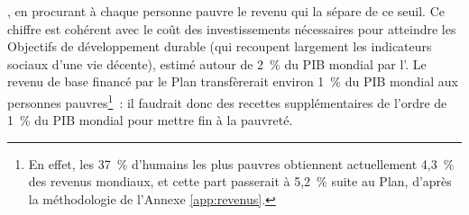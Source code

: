 \documentclass[a5paper,french,openany]{memoir}
\begin{document}
, en procurant à chaque personne pauvre le revenu qui la sépare de ce seuil. Ce chiffre est cohérent avec le coût des investissements nécessaires pour atteindre les Objectifs de développement durable (qui recoupent largement les indicateurs sociaux d'une vie décente), estimé autour de 2~\% du PIB mondial par l'\cite{unctad_estimating_2021}. %
Le revenu de base financé par le Plan transfèrerait environ 1~\% du PIB mondial aux personnes pauvres\footnote{En effet, les 37~\% d'humains les plus pauvres obtiennent actuellement 4,3~\% des revenus mondiaux, et cette part passerait à 5,2~\% suite au Plan, d'après la méthodologie de l'Annexe \ref{app:revenus}.}~: %
il faudrait donc des recettes supplémentaires de l'ordre de 1~\% du PIB mondial pour mettre fin à la pauvreté. %
\end{document}
